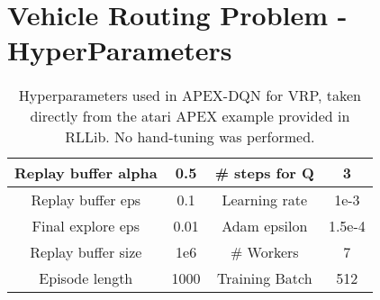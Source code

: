 \documentclass[letterpaper]{article} %
\begin{document}
\section{Vehicle Routing Problem - HyperParameters}
\label{appendix:vrp_hp}
\begin{table}[h!]
	\centering
	\begin{tabular}{ |c|c|c|c| } 
		\hline
		Replay buffer alpha & 0.5 & \# steps for Q & 3 \\ 
		\hline
		Replay buffer eps & 0.1 & Learning rate & 1e-3 \\
		\hline	
		Final explore eps & 0.01 & Adam epsilon & 1.5e-4 \\
		\hline
		Replay buffer size & 1e6 & \# Workers & 7 \\
		\hline
		Episode length & 1000 &  Training Batch & 512 \\
		\hline
	\end{tabular}
	\caption{Hyperparameters used in APEX-DQN for VRP, taken directly from the atari APEX example provided in RLLib. No hand-tuning was performed.}
	\label{table:vrp_hyperparam}
	\vspace{-1em}
\end{table}
\end{document}
